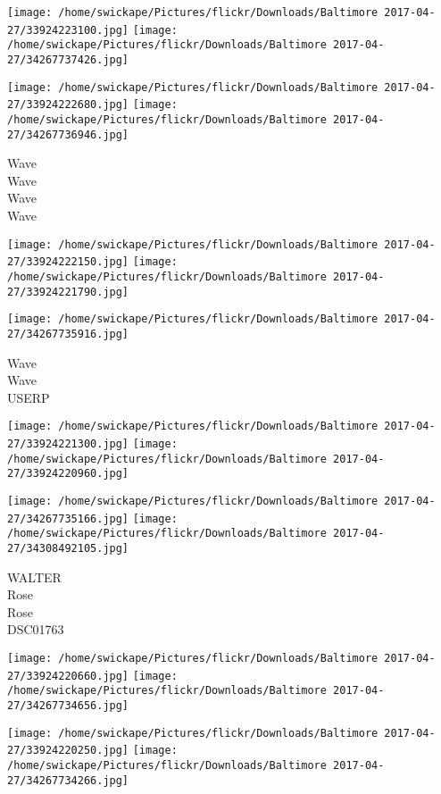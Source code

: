 \documentclass[10pt,letterpaper]{article}
\begin{document}
\texttt{[image: /home/swickape/Pictures/flickr/Downloads/Baltimore 2017-04-27/33924223100.jpg]}
\texttt{[image: /home/swickape/Pictures/flickr/Downloads/Baltimore 2017-04-27/34267737426.jpg]}

\texttt{[image: /home/swickape/Pictures/flickr/Downloads/Baltimore 2017-04-27/33924222680.jpg]}
\texttt{[image: /home/swickape/Pictures/flickr/Downloads/Baltimore 2017-04-27/34267736946.jpg]}

Wave\\
Wave\\
Wave\\
Wave
\pagebreak

\texttt{[image: /home/swickape/Pictures/flickr/Downloads/Baltimore 2017-04-27/33924222150.jpg]}
\texttt{[image: /home/swickape/Pictures/flickr/Downloads/Baltimore 2017-04-27/33924221790.jpg]}

\vspace{0.25in}
\texttt{[image: /home/swickape/Pictures/flickr/Downloads/Baltimore 2017-04-27/34267735916.jpg]}

Wave\\
Wave\\
USERP
\pagebreak

\texttt{[image: /home/swickape/Pictures/flickr/Downloads/Baltimore 2017-04-27/33924221300.jpg]}
\texttt{[image: /home/swickape/Pictures/flickr/Downloads/Baltimore 2017-04-27/33924220960.jpg]}

\texttt{[image: /home/swickape/Pictures/flickr/Downloads/Baltimore 2017-04-27/34267735166.jpg]}
\texttt{[image: /home/swickape/Pictures/flickr/Downloads/Baltimore 2017-04-27/34308492105.jpg]}

WALTER\\
Rose\\
Rose\\
DSC01763
\pagebreak

\texttt{[image: /home/swickape/Pictures/flickr/Downloads/Baltimore 2017-04-27/33924220660.jpg]}
\texttt{[image: /home/swickape/Pictures/flickr/Downloads/Baltimore 2017-04-27/34267734656.jpg]}

\texttt{[image: /home/swickape/Pictures/flickr/Downloads/Baltimore 2017-04-27/33924220250.jpg]}
\texttt{[image: /home/swickape/Pictures/flickr/Downloads/Baltimore 2017-04-27/34267734266.jpg]}
\end{document}
